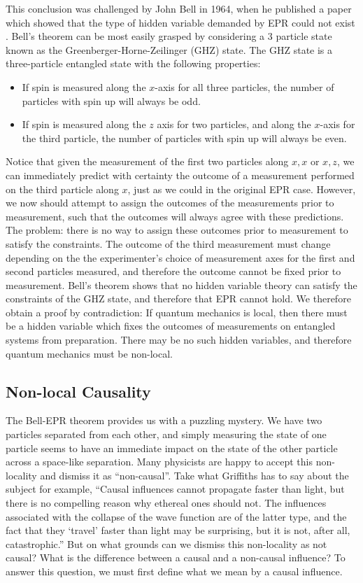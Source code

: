 This conclusion was challenged by John Bell in 1964, when he
published a paper which showed that the type of hidden variable demanded by EPR
could not exist \citep{Bell_1964}. Bell's theorem can be most easily grasped by
considering a 3 particle state known as the Greenberger-Horne-Zeilinger (GHZ)
state. The GHZ state is a three-particle entangled state with the following
properties:
\begin{itemize}
    \item If spin is measured along the $x$-axis for all three particles, the 
          number of particles with spin up will always be odd.
    \item If spin is measured along the $z$ axis for two particles, and along
          the $x$-axis for the third particle, the number of particles with spin
          up will always be even.
\end{itemize}
Notice that given the measurement of the first two particles along $x, x$ or
$x, z$, we can immediately predict with certainty the outcome of a measurement
performed on the third particle along $x$, just as we could in the original EPR
case. However, we now should attempt to assign the outcomes of the measurements
prior to measurement, such that the outcomes will always agree with these
predictions. The problem: there is no way to assign these outcomes prior to
measurement to satisfy the constraints. The outcome of the third measurement 
must change depending on the the experimenter's choice of measurement axes for 
the first and second particles measured, and therefore the outcome cannot be
fixed prior to measurement. Bell's theorem shows that no hidden variable theory
can satisfy the constraints of the GHZ state, and therefore that EPR cannot
hold. We therefore obtain a proof by contradiction: If quantum mechanics is local,
then there must be a hidden variable which fixes the outcomes of measurements on
entangled systems from preparation. There may be no such hidden variables, and 
therefore quantum mechanics must be non-local.

\subsection{Non-local Causality}

The Bell-EPR theorem provides us with a puzzling mystery. We have two particles
separated from each other, and simply measuring the state of one particle seems
to have an immediate impact on the state of the other particle across a
space-like separation. Many physicists are happy to accept this non-locality and
dismiss it as ``non-causal''. Take what Griffiths has to say about the subject
for example, ``Causal influences cannot propagate faster than light, but there is
no compelling reason why ethereal ones should not. The influences associated
with the collapse of the wave function are of the latter type, and the fact that
they `travel' faster than light may be surprising, but it is not, after all,
catastrophic.'' But on what grounds can we dismiss this non-locality as not
causal? What is the difference between a causal and a non-causal influence? To
answer this question, we must first define what we mean by a causal influence.


